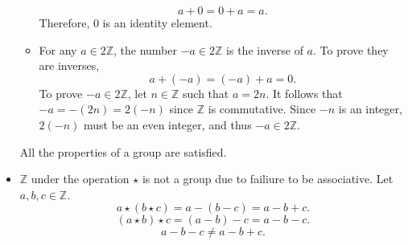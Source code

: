 \documentclass[11pt, letterpaper]{report}
\renewenvironment{solution}[1][]{\begin{bwaaa}}{\end{bwaaa}\vspace{10pt}}
\begin{document}
\begin{solution}
\begin{itemize}
\begin{itemize}
				\[
					a+0=0+a=a
				.\]
				Therefore, $0$ is an identity element.
			\item For any $a\in2\mathbb{Z}$, the  number $-a\in2\mathbb{Z}$ is the inverse of $a$. To prove they are inverses,
				\[
					a+(-a)=(-a)+a=0
				.\]
				To prove $-a\in2\mathbb{Z}$, let $n\in\mathbb{Z}$ such that $a=2n$. It follows that $-a=-(2n)=2(-n)$ since $\mathbb{Z}$ is commutative. Since $-n$ is an integer, $2(-n)$ must be an even integer, and thus $-a\in2\mathbb{Z}$.
		\end{itemize}
		All the properties of a group are satisfied.
	\item $\mathbb{Z}$ under the operation $\star$ is not a group due to failiure to be associative. Let $a,b,c\in\mathbb{Z}$.
		\[
			a\star(b\star c)=a-(b-c)=a-b+c
		.\]
		\[
			(a\star b)\star c = (a-b)-c=a-b-c
		.\]
		\[
			a-b-c\neq a-b+c
		.\]
\end{itemize}

\end{solution}
\end{document}
